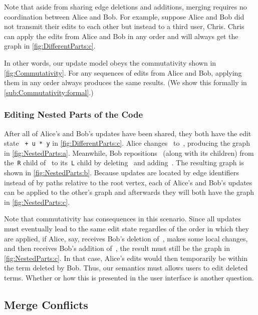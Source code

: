 Note that aside from sharing edge deletions and additions,
merging requires no coordination between Alice and Bob.
For example, suppose Alice and Bob did not transmit their edits to each other
but instead to a third user, Chris.
Chris can apply the edits from Alice and Bob in any order
and will always get the graph in \autoref{fig:DifferentParts:c}.

In other words, our update model obeys the commutativity shown in \autoref{fig:Commutativity}.
For any sequences of edits from Alice and Bob,
applying them in any order always produces the same results.
(We show this formally in \autoref{sub:Commutativity:formal}.)

\subsubsection{Editing Nested Parts of the Code}%
\label{sub:Editing Nested Parts of the Code}

After all of Alice's and Bob's updates have been shared,
they both have the edit state \texttt{\hole{} + u * y} in \autoref{fig:DifferentParts:c}.
Alice changes~\vDifferentPartsAlice{} to~\vNestedPartsAlice{},
producing the graph in \autoref{fig:NestedParts:a}.
Meanwhile, Bob repositions~\vSimpleTimes{} (along with its children)
from the~\texttt{R} child of~\vWrapPlus{} to its~\texttt{L} child
by deleting~\eMoveTimes{} and adding~\eNestedPartsBob{}.
The resulting graph is shown in \autoref{fig:NestedParts:b}.
Because updates are located by edge identifiers instead of by paths relative to the root vertex,
each of Alice's and Bob's updates can be applied to the other's graph
and afterwards they will both have the graph in \autoref{fig:NestedParts:c}.

Note that commutativity has consequences in this scenario.
Since all updates must eventually lead to the same edit state regardles of the order in which they are applied,
if Alice, say, receives Bob's deletion of~\eMoveTimes{}, makes some local changes,
and then receives Bob's addition of~\eNestedPartsBob{},
the result must still be the graph in \autoref{fig:NestedParts:c}.
In that case, Alice's edits would then temporarily be within the term deleted by Bob.
Thus, our semantics must allows users to edit deleted terms.
Whether or how this is presented in the user interface is another question.


\subsection{Merge Conflicts}%
\label{sub:Merge Conflicts}

